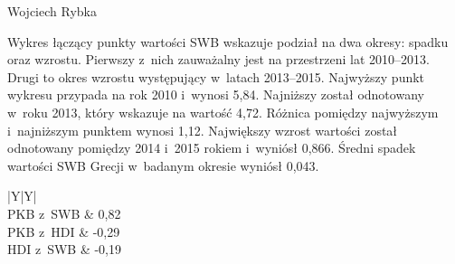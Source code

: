 \begin{artplenv}{Wojciech Rybka}
%
%

Wykres łączący punkty wartości SWB wskazuje podział na dwa okresy: spadku oraz wzrostu. Pierwszy z~nich zauważalny jest
na przestrzeni lat 2010--2013. Drugi to okres wzrostu występujący w~latach 2013--2015. Najwyższy punkt wykresu przypada
na rok 2010 i~wynosi 5,84. Najniższy został odnotowany w~roku 2013, który wskazuje na wartość 4,72. Różnica pomiędzy
najwyższym i~najniższym punktem wynosi 1,12.  Największy wzrost wartości został odnotowany pomiędzy 2014 i~2015 rokiem
i~wyniósł 0,866. Średni spadek wartości SWB Grecji w~badanym okresie wyniósł 0,043.

\captionsetup[table]{name=Tabela}
\begin{table}[H]
	\begin{tabularx}{\textwidth}{|Y|Y|}
		\hline
		\\\hline
		PKB z~SWB &
		0,82\\\hline
		PKB z~HDI &
		-0,29\\\hline
		HDI z~SWB &
		{}-0,19\\\hline
	\end{tabularx}
	
	\caption{Wartości związku pomiędzy wskaźnikami Grecji.
		Źródło: obliczenia własne na podstawie
		\parencite{international_monetary_fund_world_2019a,united_nations_development_programme_human_2019,noauthor_world_2018}.
	}
	\label{tab5:ryb}
\end{table}


%


\end{artplenv}
